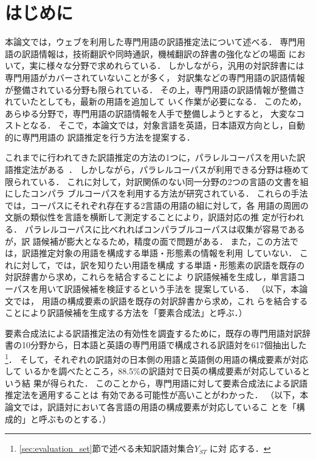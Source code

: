 \documentclass[japanese]{jnlp_1.3a}
\begin{document}
\maketitle



\section{はじめに}
\label{sec:intro}


本論文では，ウェブを利用した専門用語の訳語推定法について述べる．
専門用語の訳語情報は，技術翻訳や同時通訳，機械翻訳の辞書の強化などの場面
において，実に様々な分野で求めれらている．
しかしながら，汎用の対訳辞書には専門用語がカバーされていないことが多く，
対訳集などの専門用語の訳語情報が整備されている分野も限られている．
その上，専門用語の訳語情報が整備されていたとしても，最新の用語を追加して
いく作業が必要になる．
このため，あらゆる分野で，専門用語の訳語情報を人手で整備しようとすると，
大変なコストとなる．
そこで，本論文では，対象言語を英語，日本語双方向とし，自動的に専門用語の
訳語推定を行う方法を提案する．

これまでに行われてきた訳語推定の方法の1つに，パラレルコーパスを用いた訳
語推定法がある~\cite{Matsumoto00a}．
しかしながら，パラレルコーパスが利用できる分野は極めて限られている．
これに対して，対訳関係のない同一分野の2つの言語の文書を組にしたコンパラ
ブルコーパスを利用する方法\cite{Fung98as,Rapp99as}が研究されている．
これらの手法では，コーパスにそれぞれ存在する2言語の用語の組に対して，各
用語の周囲の文脈の類似性を言語を横断して測定することにより，訳語対応の推
定が行われる．
パラレルコーパスに比べれればコンパラブルコーパスは収集が容易であるが，訳
語候補が膨大となるため，精度の面で問題がある．
また，この方法では，訳語推定対象の用語を構成する単語・形態素の情報を利用
していない．
これに対して，\cite{Fujii00,Baldwin04multi}では，訳を知りたい用語を構成
する単語・形態素の訳語を既存の対訳辞書から求め，これらを結合することによ
り訳語候補を生成し，単言語コーパスを用いて訳語候補を検証するという手法を
提案している．
（以下，本論文では， 用語の構成要素の訳語を既存の対訳辞書から求め，これ
らを結合することにより訳語候補を生成する方法を「要素合成法」と呼ぶ．）

要素合成法による訳語推定法の有効性を調査するために，既存の専門用語対訳辞
書の10分野から，日本語と英語の専門用語で構成される訳語対を617個抽出した
\footnote{\ref{sec:evaluation_set}節で述べる未知訳語対集合$Y_{ST}$ に対
応する．}．
そして，それぞれの訳語対の日本側の用語と英語側の用語の構成要素が対応して
いるかを調べたところ，88.5\%の訳語対で日英の構成要素が対応しているという結
果が得られた．
このことから，専門用語に対して要素合成法による訳語推定法を適用することは
有効である可能性が高いことがわかった．
（以下，本論文では，訳語対において各言語の用語の構成要素が対応しているこ
とを「構成的」と呼ぶものとする．）
\end{document}
